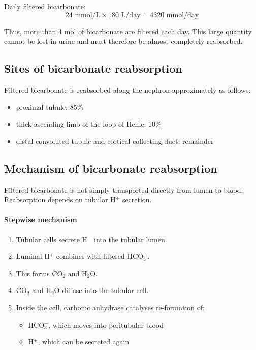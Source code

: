 \documentclass[11pt,a4paper]{article}
\begin{document}
Daily filtered bicarbonate:
\[
24 \text{ mmol/L} \times 180 \text{ L/day} = 4320 \text{ mmol/day}
\]

Thus, more than 4 mol of bicarbonate are filtered each day. This large quantity cannot be lost in urine and must therefore be almost completely reabsorbed.

\subsection{Sites of bicarbonate reabsorption}

Filtered bicarbonate is reabsorbed along the nephron approximately as follows:
\begin{itemize}
    \item proximal tubule: 85\%
    \item thick ascending limb of the loop of Henle: 10\%
    \item distal convoluted tubule and cortical collecting duct: remainder
\end{itemize}

\subsection{Mechanism of bicarbonate reabsorption}

Filtered bicarbonate is not simply transported directly from lumen to blood. Reabsorption depends on tubular H$^+$ secretion.

\paragraph{Stepwise mechanism}
\begin{enumerate}
    \item Tubular cells secrete H$^+$ into the tubular lumen.
    \item Luminal H$^+$ combines with filtered HCO$_3^-$.
    \item This forms CO$_2$ and H$_2$O.
    \item CO$_2$ and H$_2$O diffuse into the tubular cell.
    \item Inside the cell, carbonic anhydrase catalyses re-formation of:
    \begin{itemize}
        \item HCO$_3^-$, which moves into peritubular blood
        \item H$^+$, which can be secreted again
    \end{itemize}
\end{enumerate}
\end{document}
